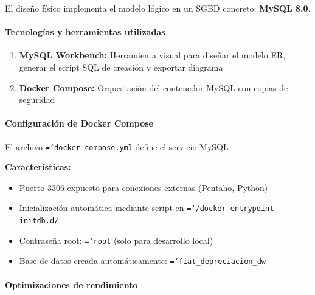 \documentclass{article}
\let\oldtexttt\texttt  %
\renewcommand{\texttt}[1]{{\footnotesize\oldtexttt{\hyphenchar\font=`\-#1}}}  %
\begin{document}
El dise\~no f\'isico implementa el modelo l\'ogico en un SGBD concreto: \textbf{MySQL 8.0}.

\paragraph{Tecnolog\'ias y herramientas utilizadas}

\begin{enumerate}
    \item \textbf{MySQL Workbench:} Herramienta visual para dise\~nar el modelo ER, generar el script SQL de creaci\'on y exportar diagrama
    \item \textbf{Docker Compose:} Orquestaci\'on del contenedor MySQL con copias de seguridad
\end{enumerate}

\paragraph{Configuraci\'on de Docker Compose}

El archivo \texttt{docker-compose.yml} define el servicio MySQL

\textbf{Caracter\'isticas:}
\begin{itemize}
    \item Puerto 3306 expuesto para conexiones externas (Pentaho, Python)
    \item Inicializaci\'on autom\'atica mediante script en \texttt{/docker-entrypoint-initdb.d/}
    \item Contrase\~na root: \texttt{root} (solo para desarrollo local)
    \item Base de datos creada autom\'aticamente: \texttt{fiat\_depreciacion\_dw}
\end{itemize}

\paragraph{Optimizaciones de rendimiento}
\end{document}
